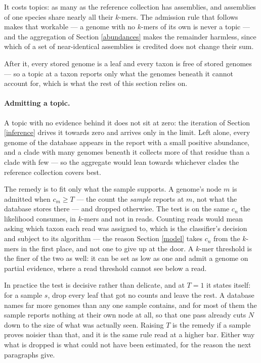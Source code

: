 \documentclass[pdflatex,sn-vancouver-num]{sn-jnl}
\begin{document}
    It costs topics: as many as the reference collection has assemblies, and assemblies of
    one species share nearly all their $k$-mers. The admission rule that follows makes that
    workable --- a genome with no $k$-mers of its own is never a topic --- and the aggregation of
    Section \ref{abundances} makes the remainder harmless, since which of a set of
    near-identical assemblies is credited does not change their sum.

    After it, every stored genome is a leaf and every taxon is free of stored genomes --- so a topic
    at a taxon reports only what the genomes beneath it cannot account for, which is what the rest of
    this section relies on.

    \paragraph{Admitting a topic.} A topic with no evidence behind it does not sit at zero: the
    iteration of Section \ref{inference} drives it towards zero and arrives only in the limit. Left
    alone, every genome of the database appears in the report with a small positive abundance, and a
    clade with many genomes beneath it collects more of that residue than a clade with few --- so the
    aggregate would lean towards whichever clades the reference collection covers best.

    The remedy is to fit only what the sample supports. A genome's node $m$ is admitted when
    $c_m \geq T$ --- the count the \emph{sample} reports at $m$, not what the database
    stores there --- and dropped otherwise. The test is on the same $c_n$ the likelihood consumes,
    in $k$-mers and not in reads. Counting reads would mean asking which taxon each
    read was assigned to, which is the classifier's decision and subject to its algorithm --- the
    reason Section \ref{model} takes $c_n$ from the $k$-mers in the first place, and not one to give
    up at the door. A $k$-mer threshold is the finer of the two as well: it can be set as low as one
    and admit a genome on partial evidence, where a read threshold cannot see below a read.

    In practice the test is decisive rather than delicate, and at $T = 1$ it states itself: for a
    sample $s$, drop every leaf that got no counts and leave the rest. A database names far more
    genomes than any one sample contains, and for most of them the sample reports nothing at their
    own node at all, so that one pass already cuts $N$ down to the size of what was actually seen. Raising
    $T$ is the remedy if a sample proves noisier than that, and it is the same rule read at a higher
    bar. Either way what is dropped is what could not have been estimated, for the reason the next
    paragraphs give.
\end{document}
